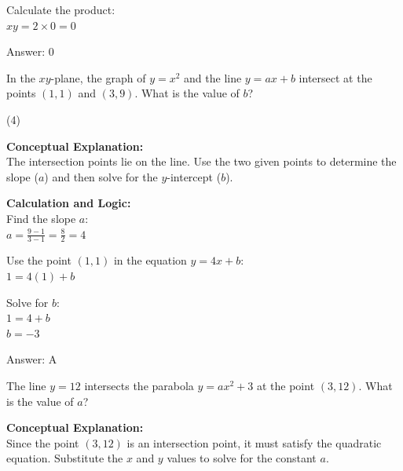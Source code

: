 \documentclass[11pt,paper=a4,answers]{exam}
\begin{document}
\begin{questions}
\begin{solution}
Calculate the product: \\
$xy = 2 \times 0 = 0$

\vspace{25pt}

Answer: \colorbox{yellow!100}{0}
\end{solution}

\vspace{40pt}

\question
In the $xy$-plane, the graph of $y = x^2$ and the line $y = ax + b$ intersect at the points $(1, 1)$ and $(3, 9)$. What is the value of $b$?
\begin{tasks}(4)
\end{tasks}

\begin{solution}
\textbf{Conceptual Explanation:} \\
The intersection points lie on the line. Use the two given points to determine the slope ($a$) and then solve for the $y$-intercept ($b$).

\vspace{20pt}

\textbf{Calculation and Logic:} \\
Find the slope $a$: \\
$a = \frac{9 - 1}{3 - 1} = \frac{8}{2} = 4$

\vspace{10pt}

Use the point $(1, 1)$ in the equation $y = 4x + b$: \\
$1 = 4(1) + b$

\vspace{10pt}

Solve for $b$: \\
$1 = 4 + b$ \\
$b = -3$

\vspace{25pt}

Answer: \colorbox{yellow!100}{A}
\end{solution}

\vspace{40pt}

\question
The line $y = 12$ intersects the parabola $y = ax^2 + 3$ at the point $(3, 12)$. What is the value of $a$?

\begin{solution}
\textbf{Conceptual Explanation:} \\
Since the point $(3, 12)$ is an intersection point, it must satisfy the quadratic equation. Substitute the $x$ and $y$ values to solve for the constant $a$.


\end{solution}
\end{questions}
\end{document}
